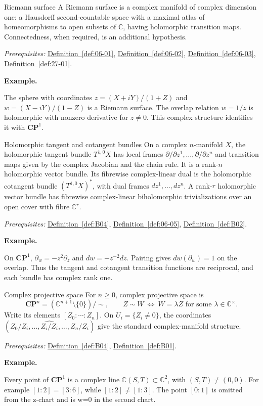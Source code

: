 \documentclass[11pt]{article}
\makeatletter
\newcommand{\C}{\mathbb C}
\newcounter{definition}
\newcommand{\CP}{\mathbf{CP}}
\newcommand{\exampleheading}{\par\medskip\textbf{Example.}\par\smallskip}
\newcommand{\currentdefinition}[1]{\protected@edef\@currentlabel{#1}}
\makeatother
\begin{document}
\begin{definitionbox}{Riemann surface}
\currentdefinition{\thedefinition}
\label{def:27-02}
A Riemann surface is a complex manifold of complex dimension one: a Hausdorff second-countable space with a maximal atlas of homeomorphisms to open subsets of $\C$, having holomorphic transition maps. Connectedness, when required, is an additional hypothesis.

\smallskip
\textit{Prerequisites:} \hyperref[def:06-01]{Definition~\ref*{def:06-01}}, \hyperref[def:06-02]{Definition~\ref*{def:06-02}}, \hyperref[def:06-03]{Definition~\ref*{def:06-03}}, \hyperref[def:27-01]{Definition~\ref*{def:27-01}}.

\exampleheading
The sphere with coordinates $z=(X+iY)/(1+Z)$ and $w=(X-iY)/(1-Z)$ is a Riemann surface. The overlap relation $w=1/z$ is holomorphic with nonzero derivative for $z\ne0$. This complex structure identifies it with $\CP^1$.
\end{definitionbox}

\begin{definitionbox}{Holomorphic tangent and cotangent bundles}
\currentdefinition{\thedefinition}
\label{def:B07}
On a complex $n$-manifold $X$, the holomorphic tangent bundle $T^{1,0}X$ has local frames $\partial/\partial z^1,\ldots,\partial/\partial z^n$ and transition maps given by the complex Jacobian and the chain rule. It is a rank-$n$ holomorphic vector bundle. Its fibrewise complex-linear dual is the holomorphic cotangent bundle $(T^{1,0}X)^*$, with dual frames $dz^1,\ldots,dz^n$. A rank-$r$ holomorphic vector bundle has fibrewise complex-linear biholomorphic trivializations over an open cover with fibre $\C^r$.

\smallskip
\textit{Prerequisites:} \hyperref[def:B04]{Definition~\ref*{def:B04}}, \hyperref[def:06-05]{Definition~\ref*{def:06-05}}, \hyperref[def:B02]{Definition~\ref*{def:B02}}.

\exampleheading
On $\CP^1$, $\partial_w=-z^2\partial_z$ and $dw=-z^{-2}dz$. Pairing gives $dw(\partial_w)=1$ on the overlap. Thus the tangent and cotangent transition functions are reciprocal, and each bundle has complex rank one.
\end{definitionbox}

\begin{definitionbox}{Complex projective space}
\currentdefinition{\thedefinition}
\label{def:N23}
For $n\ge0$, complex projective space is
\[\CP^n=(\C^{n+1}\setminus\{0\})/\sim,\qquad Z\sim W\ \Longleftrightarrow\ W=\lambda Z\text{ for some }\lambda\in\C^\times.\]
Write its elements $[Z_0:\cdots:Z_n]$. On $U_i=\{Z_i\ne0\}$, the coordinates $(Z_0/Z_i,\ldots,\widehat{Z_i/Z_i},\ldots,Z_n/Z_i)$ give the standard complex-manifold structure.

\smallskip
\textit{Prerequisites:} \hyperref[def:B04]{Definition~\ref*{def:B04}}, \hyperref[def:B01]{Definition~\ref*{def:B01}}.

\exampleheading
Every point of $\CP^1$ is a complex line $\C(S,T)\subset\C^2$, with $(S,T)\ne(0,0)$. For example $[1:2]=[3:6]$, while $[1:2]\ne[1:3]$. The point $[0:1]$ is omitted from the z-chart and is w=0 in the second chart.
\end{definitionbox}
\end{document}
